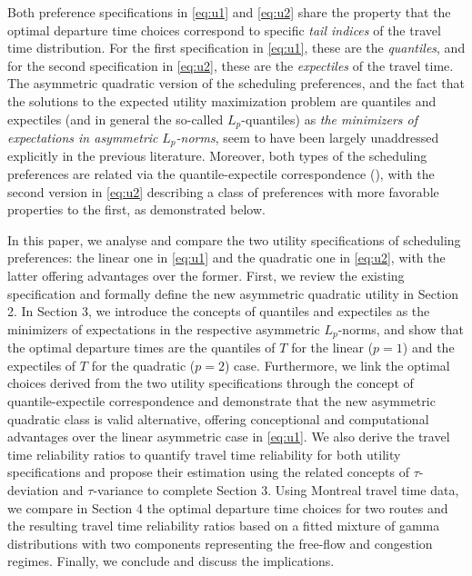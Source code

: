 \documentclass[preprint, 3p, authoryear]{elsarticle} %
\theoremstyle{definition}
\theoremstyle{definition}
\theoremstyle{definition}
\theoremstyle{definition}
\theoremstyle{remark}
\begin{document}
Both preference specifications in \eqref{eq:u1} and \eqref{eq:u2} share the property that the optimal departure time choices correspond to specific \emph{tail indices} of the travel time distribution. For the first specification in \eqref{eq:u1}, these are the \emph{quantiles}, and for the second specification in \eqref{eq:u2}, these are the \emph{expectiles} of the travel time. The asymmetric quadratic version of the scheduling preferences, and the fact that the solutions to the expected utility maximization problem are quantiles and expectiles (and in general the so-called \(L_p\)-quantiles) as \emph{the minimizers of expectations in asymmetric} \(L_p\)\emph{-norms}, seem to have been largely unaddressed explicitly in the previous literature. Moreover, both types of the scheduling preferences are related via the quantile-expectile correspondence (\citet{jones1994}), with the second version in \eqref{eq:u2} describing a class of preferences with more favorable properties to the first, as demonstrated below.

In this paper, we analyse and compare the two utility specifications of scheduling preferences: the linear one in \eqref{eq:u1} and the quadratic one in \eqref{eq:u2}, with the latter offering advantages over the former. First, we review the existing specification and formally define the new asymmetric quadratic utility in Section 2. In Section 3, we introduce the concepts of quantiles and expectiles as the minimizers of expectations in the respective asymmetric \(L_p\)-norms, and show that the optimal departure times are the quantiles of \(T\) for the linear (\(p=1\)) and the expectiles of \(T\) for the quadratic (\(p=2\)) case. Furthermore, we link the optimal choices derived from the two utility specifications through the concept of quantile-expectile correspondence and demonstrate that the new asymmetric quadratic class is valid alternative, offering conceptional and computational advantages over the linear asymmetric case in \eqref{eq:u1}. We also derive the travel time reliability ratios to quantify travel time reliability for both utility specifications and propose their estimation using the related concepts of \(\tau\)-deviation and \(\tau\)-variance to complete Section 3. Using Montreal travel time data, we compare in Section 4 the optimal departure time choices for two routes and the resulting travel time reliability ratios based on a fitted mixture of gamma distributions with two components representing the free-flow and congestion regimes. Finally, we conclude and discuss the implications.
\end{document}
